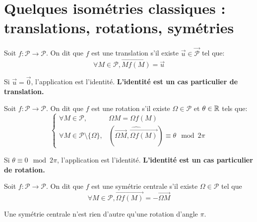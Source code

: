 \section{Quelques isométries classiques : translations, rotations, symétries}

\begin{definition}
Soit $f : \mathcal P\to \mathcal P$. On dit que $f$ est une translation s'il existe $\overrightarrow{u} \in \overrightarrow{\mathcal P}$ tel que:
\[ \forall M \in\mathcal P, \overrightarrow{Mf(M)} = \overrightarrow u\]
\end{definition}

\begin{remarque}
Si $\overrightarrow u=\overrightarrow 0$, l'application est l'identité. \textbf{L'identité est un cas particulier de translation.}
\end{remarque}


\begin{definition}
Soit $f : \mathcal P\to \mathcal P$. On dit que $f$ est une rotation s'il existe $\Omega\in\mathcal P$ et $\theta\in\mathbb{R}$ tels que:
\[ 
\begin{cases}
\forall M\in\mathcal P, &\Omega M = \Omega f(M)\\
\forall M\in\mathcal P \setminus\{\Omega\},& (\widehat{\overrightarrow{\Omega M},\overrightarrow{\Omega f(M)}})\equiv \theta \mod 2\pi
\end{cases}
\]
\end{definition}


\begin{remarque}
Si $\theta\equiv 0 \mod 2\pi$, l'application est l'identité. \textbf{L'identité est un cas particulier de rotation.}
\end{remarque}

\begin{definition}
Soit $f : \mathcal P\to \mathcal P$. On dit que $f$ est une symétrie centrale s'il existe $\Omega\in\mathcal P$ tel que
\[ \forall M\in\mathcal P, \overrightarrow{\Omega f(M)}=-\overrightarrow{\Omega M}\]
\end{definition}

\begin{remarque}
Une symétrie centrale n'est rien d'autre qu'une rotation d'angle $\pi$.
\end{remarque}

